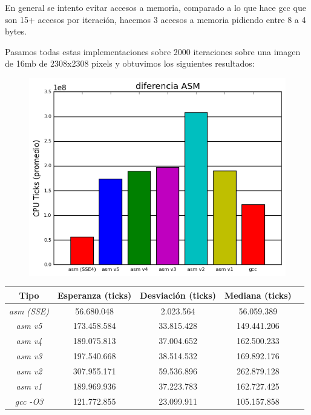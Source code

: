 \documentclass[a4paper]{article}
\begin{document}
En general se intento evitar accesos a memoria, comparado a lo que hace gcc que son 15+ accesos por iteración, hacemos 3 accesos a memoria pidiendo entre 8 a 4 bytes.

Pasamos todas estas implementaciones sobre 2000 iteraciones sobre una imagen de 16mb de 2308x2308 pixels y obtuvimos los siguientes resultados:

\begin{figure}[h]
	\centerline{\includegraphics[scale=0.8]{imagenes/test_diferencia_ASM_imp}}
\end{figure}

\begin{center}
        \begin{tabular}[c]{|c|c|c|c|c|}
    \hline
        \textbf{Tipo} &  \textbf{Esperanza (ticks)} & \textbf{Desviación (ticks)} & \textbf{Mediana (ticks)}\\
        \hline
\textit{asm (SSE)} &    56.680.048  & 2.023.564 & 56.059.389\\
        \hline
\textit{asm v5} &   173.458.584    & 33.815.428 & 149.441.206\\
        \hline
\textit{asm v4} &   189.075.813    & 37.004.652 & 162.500.233 \\
        \hline
\textit{asm v3} &  197.540.668  & 38.514.532 & 169.892.176\\
        \hline
\textit{asm v2} &  307.955.171   & 59.536.896 & 262.879.128\\
        \hline
\textit{asm v1} &  189.969.936 & 37.223.783 & 162.727.425\\
        \hline
\textit{gcc -O3} &  121.772.855 & 23.099.911 & 105.157.858\\
        \hline
    \end{tabular}
\end{center}
\end{document}

